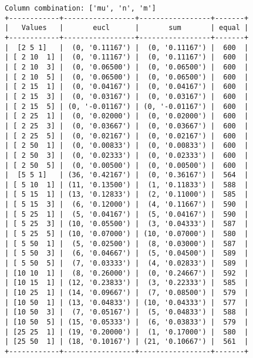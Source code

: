 \documentclass{article}
\begin{document}
\begin{verbatim}
Column combination: ['mu', 'n', 'm']
+------------+-----------------+-----------------+-------+
|   Values   |       eucl      |       sum       | equal |
+------------+-----------------+-----------------+-------+
|  [2 5 1]   |  (0, '0.11167') |  (0, '0.11167') |  600  |
| [ 2 10  1] |  (0, '0.11167') |  (0, '0.11167') |  600  |
| [ 2 10  3] |  (0, '0.06500') |  (0, '0.06500') |  600  |
| [ 2 10  5] |  (0, '0.06500') |  (0, '0.06500') |  600  |
| [ 2 15  1] |  (0, '0.04167') |  (0, '0.04167') |  600  |
| [ 2 15  3] |  (0, '0.03167') |  (0, '0.03167') |  600  |
| [ 2 15  5] | (0, '-0.01167') | (0, '-0.01167') |  600  |
| [ 2 25  1] |  (0, '0.02000') |  (0, '0.02000') |  600  |
| [ 2 25  3] |  (0, '0.03667') |  (0, '0.03667') |  600  |
| [ 2 25  5] |  (0, '0.02167') |  (0, '0.02167') |  600  |
| [ 2 50  1] |  (0, '0.00833') |  (0, '0.00833') |  600  |
| [ 2 50  3] |  (0, '0.02333') |  (0, '0.02333') |  600  |
| [ 2 50  5] |  (0, '0.00500') |  (0, '0.00500') |  600  |
|  [5 5 1]   | (36, '0.42167') |  (0, '0.36167') |  564  |
| [ 5 10  1] | (11, '0.13500') |  (1, '0.11833') |  588  |
| [ 5 15  1] | (13, '0.12833') |  (2, '0.11000') |  585  |
| [ 5 15  3] |  (6, '0.12000') |  (4, '0.11667') |  590  |
| [ 5 25  1] |  (5, '0.04167') |  (5, '0.04167') |  590  |
| [ 5 25  3] | (10, '0.05500') |  (3, '0.04333') |  587  |
| [ 5 25  5] | (10, '0.07000') | (10, '0.07000') |  580  |
| [ 5 50  1] |  (5, '0.02500') |  (8, '0.03000') |  587  |
| [ 5 50  3] |  (6, '0.04667') |  (5, '0.04500') |  589  |
| [ 5 50  5] |  (7, '0.03333') |  (4, '0.02833') |  589  |
| [10 10  1] |  (8, '0.26000') |  (0, '0.24667') |  592  |
| [10 15  1] | (12, '0.23833') |  (3, '0.22333') |  585  |
| [10 25  1] | (14, '0.09667') |  (7, '0.08500') |  579  |
| [10 50  1] | (13, '0.04833') | (10, '0.04333') |  577  |
| [10 50  3] |  (7, '0.05167') |  (5, '0.04833') |  588  |
| [10 50  5] | (15, '0.05333') |  (6, '0.03833') |  579  |
| [25 25  1] | (19, '0.20000') |  (1, '0.17000') |  580  |
| [25 50  1] | (18, '0.10167') | (21, '0.10667') |  561  |
+------------+-----------------+-----------------+-------+
\end{verbatim}
\end{document}
